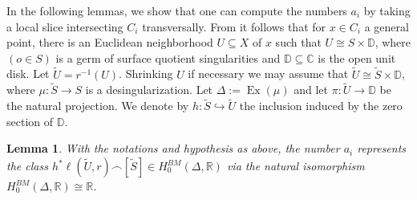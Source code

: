 \documentclass[12pt]{amsart}
\newcommand{\<}{\leq}
\def\subset{\subseteq}
\def\injective{\hookrightarrow}
\newtheorem{lemma}[theorem]{Lemma}
\theoremstyle{remark}
\theoremstyle{definition}
\theoremstyle{definition}
\numberwithin{equation}{section}
\theoremstyle{definition}
\theoremstyle{definition}
\def\Ex{\operatorname{Ex}}
\begin{document}
In the following lemmas, we show that one can compute the numbers  $a_i$ by taking a local slice intersecting $C_i$ transversally. 
From  \cite[Lemma 5.8]{GK20} it follows that for $x\in C_i$ a general point, there is an Euclidean neighborhood $U\subseteq X$ of $x$ such that $U\cong S\times \mathbb{D}$, where $(o\in S)$ is a germ of surface quotient singularities and $\mathbb{D} \subset \mathbb{C}$ is the open unit disk.   
Let $\widetilde{U}= r^{-1}(U)$. 
Shrinking $U$ if necessary we may assume that $\widetilde{U} \cong \widetilde{S}\times \mathbb{D}$, 
where $\mu\colon \widetilde{S} \to S$ is a desingularization. 
Let $\Delta:=\Ex(\mu)$ and  let $\pi\colon \widetilde{U}\to \mathbb{D}$ be the natural projection. 
We denote by $h\colon \widetilde{S} \injective \widetilde{U}$   the inclusion induced by the zero section of $\mathbb{D}$. 



\begin{lemma}
\label{lemma:a_i-intersection}   
With the notations and hypothesis as above, 
the number $a_i$ represents the class
 $h^*\ell(\widetilde{U}, r) \smallfrown [\widetilde{S}] \in H_0^{BM}(\Delta, \mathbb{R})$ \textit{via} the natural isomorphism $H_0^{BM}(\Delta, \mathbb{R}) \cong \mathbb{R}$. 
\end{lemma}
\end{document}
